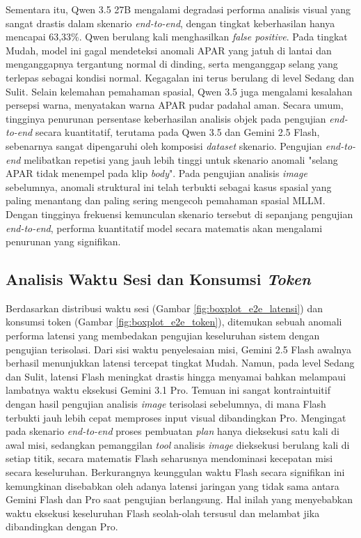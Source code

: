 Sementara itu, Qwen 3.5 27B mengalami degradasi performa analisis visual yang sangat drastis dalam skenario \textit{end-to-end}, dengan tingkat keberhasilan hanya mencapai 63,33\%. Qwen berulang kali menghasilkan \textit{false positive}. Pada tingkat Mudah, model ini gagal mendeteksi anomali APAR yang jatuh di lantai dan menganggapnya tergantung normal di dinding, serta menganggap selang yang terlepas sebagai kondisi normal. Kegagalan ini terus berulang di level Sedang dan Sulit. Selain kelemahan pemahaman spasial, Qwen 3.5 juga mengalami kesalahan persepsi warna, menyatakan warna APAR pudar padahal aman. Secara umum, tingginya penurunan persentase keberhasilan analisis objek pada pengujian \textit{end-to-end} secara kuantitatif, terutama pada Qwen 3.5 dan Gemini 2.5 Flash, sebenarnya sangat dipengaruhi oleh komposisi \textit{dataset} skenario. Pengujian \textit{end-to-end} melibatkan repetisi yang jauh lebih tinggi untuk skenario anomali "selang APAR tidak menempel pada klip \textit{body}". Pada pengujian analisis \textit{image} sebelumnya, anomali struktural ini telah terbukti sebagai kasus spasial yang paling menantang dan paling sering mengecoh pemahaman spasial MLLM. Dengan tingginya frekuensi kemunculan skenario tersebut di sepanjang pengujian \textit{end-to-end}, performa kuantitatif model secara matematis akan mengalami penurunan yang signifikan.

\subsection{Analisis Waktu Sesi dan Konsumsi \textit{Token}}
Berdasarkan distribusi waktu sesi (Gambar \ref{fig:boxplot_e2e_latensi}) dan konsumsi token (Gambar \ref{fig:boxplot_e2e_token}), ditemukan sebuah anomali performa latensi yang membedakan pengujian keseluruhan sistem dengan pengujian terisolasi. Dari sisi waktu penyelesaian misi, Gemini 2.5 Flash awalnya berhasil menunjukkan latensi tercepat tingkat Mudah. Namun, pada level Sedang dan Sulit, latensi Flash meningkat drastis hingga menyamai bahkan melampaui lambatnya waktu eksekusi Gemini 3.1 Pro. Temuan ini sangat kontraintuitif dengan hasil pengujian analisis \textit{image} terisolasi sebelumnya, di mana Flash terbukti jauh lebih cepat memproses input visual dibandingkan Pro. Mengingat pada skenario \textit{end-to-end} proses pembuatan \textit{plan} hanya dieksekusi satu kali di awal misi, sedangkan pemanggilan \textit{tool} analisis \textit{image} dieksekusi berulang kali di setiap titik, secara matematis Flash seharusnya mendominasi kecepatan misi secara keseluruhan. Berkurangnya keunggulan waktu Flash secara signifikan ini kemungkinan disebabkan oleh adanya latensi jaringan yang tidak sama antara Gemini Flash dan Pro saat pengujian berlangsung. Hal inilah yang menyebabkan waktu eksekusi keseluruhan Flash seolah-olah tersusul dan melambat jika dibandingkan dengan Pro.

